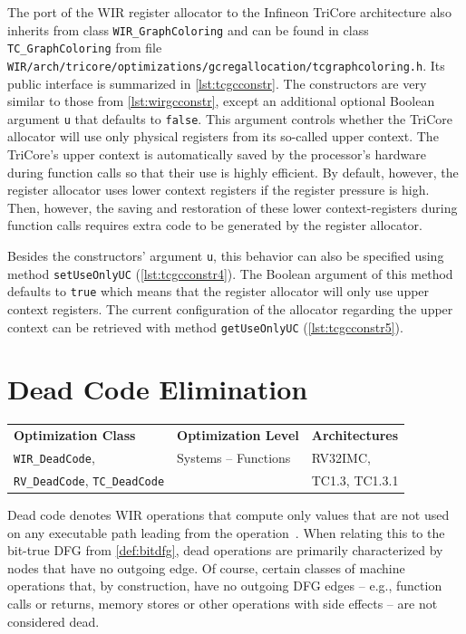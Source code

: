The port of the \gls{WIR} register allocator to the Infineon TriCore architecture also inherits from class \texttt{WIR\_Graph\-Coloring} and can be found in class \texttt{TC\_GraphColoring} from file \texttt{WIR/arch/tricore/optimizations/gc\-regallocation/tcgraphcoloring.h}.
Its public interface is summarized in \cref{lst:tcgcconstr}.
The constructors are very similar to those from \cref{lst:wirgcconstr}, except an additional optional Boolean argument \texttt{u} that defaults to \texttt{false}.
This argument controls whether the TriCore allocator will use only physical registers from its so-called upper context.
The TriCore's upper context is automatically saved by the processor's hardware during function calls so that their use is highly efficient.
By default, however, the register allocator uses lower context registers if the register pressure is high.
Then, however, the saving and restoration of these lower context-registers during function calls requires extra code to be generated by the register allocator.

Besides the constructors' argument \texttt{u}, this behavior can also be specified using method \texttt{setUseOnlyUC} (\cref{lst:tcgcconstr4}).
The Boolean argument of this method defaults to \texttt{true} which means that the register allocator will only use upper context registers.
The current configuration of the allocator regarding the upper context can be retrieved with method \texttt{getUseOnlyUC} (\cref{lst:tcgcconstr5}).


\section{Dead Code Elimination}
\label{sec:optdce}

\begin{tabular}{|l|l|l|}
  \hline
  \textbf{Optimization Class} & \textbf{Optimization Level} & \textbf{Architectures} \\
  \hhline{|=|=|=|}
  \texttt{WIR\_DeadCode}, & Systems -- Functions & RV32IMC, \\
  \texttt{RV\_DeadCode}, \texttt{TC\_DeadCode} & & TC1.3, TC1.3.1 \\
  \hline
\end{tabular}

Dead code denotes \gls{WIR} operations that compute only values that are not used on any executable path leading from the operation~\cite[chapter~18.10]{Much97}.
When relating this to the bit-true \gls{DFG} from \cref{def:bitdfg}, dead operations are primarily characterized by nodes that have no outgoing edge.
Of course, certain classes of machine operations that, by construction, have no outgoing \gls{DFG} edges -- e.g., function calls or returns, memory stores or other operations with side effects -- are not considered dead.

